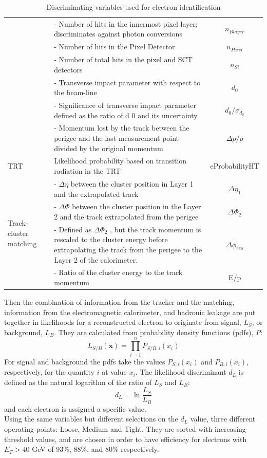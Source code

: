 \documentclass[a4paper, oneside]{book}
\begin{document}
\begin{table}
\begin{tabular}{lp{8cm}c}
					& - Number of hits in the innermost pixel layer; discriminates against photon conversions & $n_{Blayer}$ \\
					& - Number of hits in the Pixel Detector & $n_{Pixel}$ \\
					& - Number of total hits in the pixel and SCT detectors & $n_{Si}$ \\
					& - Transverse impact parameter with respect to the beam-line & $d_0$ \\
					& - Significance of transverse impact parameter defined as the ratio of d 0 and its uncertainty & $d_0/\sigma_{d_0}$ \\
					& - Momentum lost by the track between the perigee and the last measurement point divided by the original momentum & $\Delta p/p$ \\
					\midrule 
					TRT & Likelihood probability based on transition radiation in the TRT & eProbabilityHT \\
					\midrule 
					\multirow[t]{4}{*}{Track-cluster matching}
					& - $\Delta \eta$ between the cluster position in Layer 1 and the extrapolated track & $\Delta \eta_1$ \\
					& - $\Delta \Phi$ between the cluster position in the Layer 2 and the track extrapolated from the perigee & $\Delta \Phi_2$ \\
					& - Defined as $\Delta \Phi_2$ , but the track momentum is rescaled to the cluster energy before extrapolating the track from the perigee to the Layer 2 of the calorimeter. & $\Delta \phi_{res}$ \\
					& - Ratio of the cluster energy to the track momentum & E/p \\
					\bottomrule[1.5pt]
				\end{tabular}
				\caption{Discriminating variables used for electron identification \cite{Identification}}
				\label{tab:el parameters}
			\end{table}
			Then the combination of information from the tracker and the matching, information from the electromagnetic calorimeter, and hadronic leakage  are put together in likelihoods for a reconstructed electron to originate from signal,
			$L_S$, or background, $L_B$. They are calculated from probability density functions (pdfs), $P$:
			$$
			L_{S/B}(\textbf{x}) = \prod_{i=1}^{n}P_{S/B,i}(x_i)
			$$
			For signal and background the pdfs take the values $P_{S,i}(x_i)$ and $P_{B,i}(x_i)$, respectively, for the quantity $i$ at value $x_i$. The likelihood discriminant $d_L$ is defined as the natural logarithm of the ratio of $L_S$ and $L_B$:
			$$
			d_L = \ln{\frac{L_S}{L_B}}
			$$
			and each electron is assigned a specific value.\\
			Using the same variables but different selections on the $d_L$ value, three different operating points: Loose, Medium and Tight. They are sorted with increasing threshold values, and are chosen in order to have efficiency for electrons with $E_T > 40$ GeV of 93\%, 88\%, and 80\% respectively.
			
\end{document}

